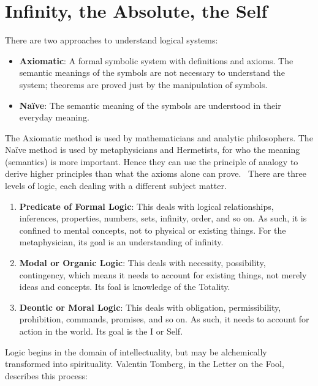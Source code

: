 \section{Infinity, the Absolute, the Self}

There are two approaches to understand logical systems:

\begin{itemize}
\item \textbf{Axiomatic}: A formal symbolic system with definitions and axioms. The semantic meanings of the symbols are not necessary to understand the system; theorems are proved just by the manipulation of symbols. 
\item \textbf{Naïve}: The semantic meaning of the symbols are understood in their everyday meaning. 
\end{itemize}
The Axiomatic method is used by mathematicians and analytic philosophers. The Naïve method is used by metaphysicians and Hermetists, for who the meaning (semantics) is more important. Hence they can use the principle of analogy to derive higher principles than what the axioms alone can prove.  There are three levels of logic, each dealing with a different subject matter.

\begin{enumerate}
\item \textbf{Predicate of Formal Logic}: This deals with logical relationships, inferences, properties, numbers, sets, infinity, order, and so on. As such, it is confined to mental concepts, not to physical or existing things. For the metaphysician, its goal is an understanding of infinity. 
\item \textbf{Modal or Organic Logic}: This deals with necessity, possibility, contingency, which means it needs to account for existing things, not merely ideas and concepts. Its foal is knowledge of the Totality. 
\item \textbf{Deontic or Moral Logic}: This deals with obligation, permissibility, prohibition, commands, promises, and so on. As such, it needs to account for action in the world. Its goal is the I or Self. 
\end{enumerate}
Logic begins in the domain of intellectuality, but may be alchemically transformed into spirituality. Valentin Tomberg, in the Letter on the Fool, describes this process:


